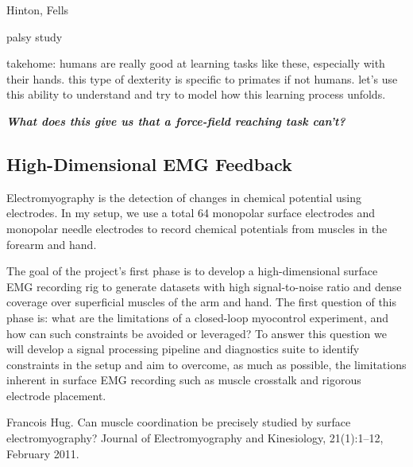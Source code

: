 \documentclass[
  a4paper,
]{article}
\begin{document}
Hinton, Fells

palsy study

takehome: humans are really good at learning tasks like these,
especially with their hands. this type of dexterity is specific to
primates if not humans. let's use this ability to understand and try to
model how this learning process unfolds.

\textbf{\emph{What does this give us that a force-field reaching task
can't?}}

\hypertarget{high-dimensional-emg-feedback}{%
\subsection{High-Dimensional EMG
Feedback}\label{high-dimensional-emg-feedback}}

Electromyography is the detection of changes in chemical potential using
electrodes. In my setup, we use a total 64 monopolar surface electrodes
and monopolar needle electrodes to record chemical potentials from
muscles in the forearm and hand.

The goal of the project's first phase is to develop a high-dimensional
surface EMG recording rig to generate datasets with high signal-to-noise
ratio and dense coverage over superficial muscles of the arm and hand.
The first question of this phase is: what are the limitations of a
closed-loop myocontrol experiment, and how can such constraints be
avoided or leveraged? To answer this question we will develop a signal
processing pipeline and diagnostics suite to identify constraints in the
setup and aim to overcome, as much as possible, the limitations inherent
in surface EMG recording such as muscle crosstalk and rigorous electrode
placement.

Francois Hug. Can muscle coordination be precisely studied by surface
electromyography? Journal of Electromyography and Kinesiology,
21(1):1--12, February 2011.
\end{document}

